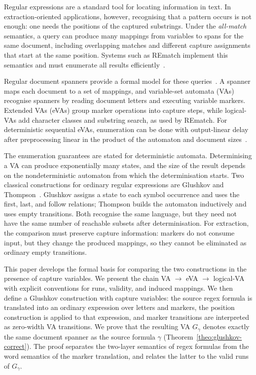 
Regular expressions are a standard tool for locating information in
text. In extraction-oriented applications, however, recognising that a
pattern occurs is not enough: one needs the positions of the captured
substrings. Under the \emph{all-match} semantics, a query can produce
many mappings from variables to spans for the same document, including
overlapping matches and different capture assignments that start at the
same position. Systems such as REmatch implement this semantics and
must enumerate all results efficiently~\cite{RiverosJV23}.

Regular document spanners provide a formal model for these
queries~\cite{FlorenzanoRUVV20}. A spanner maps each document to a set
of mappings, and variable-set automata (VAs) recognise spanners by
reading document letters and executing variable markers. Extended VAs
(eVAs) group marker operations into capture steps, while logical-VAs
add character classes and substring search, as used by REmatch. For
deterministic sequential eVAs, enumeration can be done with
output-linear delay after preprocessing linear in the product of the
automaton and document sizes~\cite{FlorenzanoRUVV20}.

The enumeration guarantees are stated for deterministic automata.
Determinising a VA can produce exponentially many states, and the size
of the result depends on the nondeterministic automaton from which the
determinisation starts. Two classical constructions for ordinary
regular expressions are Glushkov and Thompson~\cite{GiammarresiPW98}.
Glushkov assigns a state to each symbol occurrence and uses the first,
last, and follow relations; Thompson builds the automaton inductively
and uses empty transitions. Both recognise the same language, but they
need not have the same number of reachable subsets after
determinisation. For extraction, the comparison must preserve capture
information: markers do not consume input, but they change the produced
mappings, so they cannot be eliminated as ordinary empty transitions.

This paper develops the formal basis for comparing the two
constructions in the presence of capture variables. We present the
chain VA $\to$ eVA $\to$ logical-VA with explicit conventions for runs,
validity, and induced mappings. We then define a Glushkov construction
with capture variables: the source regex formula is translated into an
ordinary expression over letters and markers, the position construction
is applied to that expression, and marker transitions are interpreted
as zero-width VA transitions. We prove that the resulting VA
$G_\gamma$ denotes exactly the same document spanner as the source
formula $\gamma$ (Theorem~\ref{theo:glushkov-correct}). The proof
separates the two-layer semantics of regex formulas from the word
semantics of the marker translation, and relates the latter to the
valid runs of $G_\gamma$.

